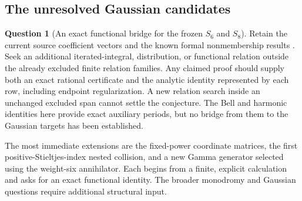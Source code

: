 \documentclass[11pt,a4paper]{article}
\numberwithin{equation}{section}
\theoremstyle{definition}
\newtheorem{question}[theorem]{Question}
\theoremstyle{remark}
\begin{document}
\subsection{The unresolved Gaussian candidates}

\begin{question}[An exact functional bridge for the frozen $S_6$ and $S_8$]
Retain the current source coefficient vectors and the known formal
nonmembership results \cite{RepoMain,RepoExactResonant}. Seek an
additional iterated-integral, distribution, or functional relation
outside the already excluded finite relation families. Any claimed
proof should supply both an exact rational certificate and the
analytic identity represented by each row, including endpoint
regularization. A new relation search inside an unchanged excluded
span cannot settle the conjecture. The Bell and harmonic identities
here provide exact auxiliary periods, but no bridge from them to
the Gaussian targets has been established.
\end{question}

The most immediate extensions are the fixed-power coordinate matrices,
the first positive-Stieltjes-index nested collision, and a new Gamma
generator selected using the weight-six annihilator. Each begins from
a finite, explicit calculation and asks for an exact functional
identity. The broader monodromy and Gaussian questions require
additional structural input.

\end{document}
